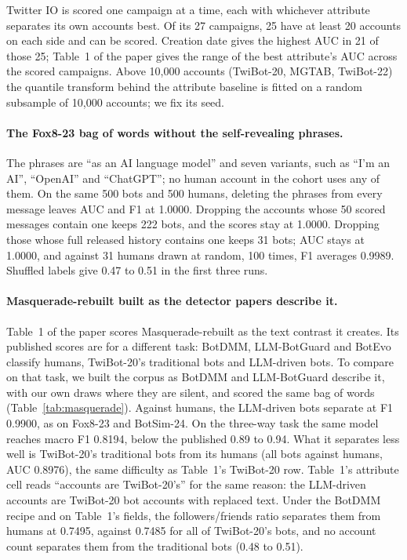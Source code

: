 \documentclass[10pt,a4paper]{article}
\begin{document}
Twitter IO is scored one campaign at a time, each with whichever attribute separates its own
  accounts best.
Of its 27 campaigns, 25 have at least 20 accounts on each side and can be scored.
Creation date gives the highest AUC in 21 of those 25; Table~1 of the paper gives the
  range of the best attribute's AUC across the scored campaigns.
Above 10,000 accounts (TwiBot-20, MGTAB, TwiBot-22) the quantile transform behind the attribute baseline is fitted
  on a random subsample of 10,000 accounts; we fix its seed.

\paragraph{The Fox8-23 bag of words without the self-revealing phrases.}
The phrases are ``as an AI language model'' and seven variants, such as ``I'm an AI'',
  ``OpenAI'' and ``ChatGPT''; no human account in the cohort uses any of them.
On the same 500 bots and 500 humans, deleting the phrases from every message leaves AUC and F1 at
  1.0000.
Dropping the accounts whose 50 scored messages contain one keeps 222 bots, and the scores stay at
  1.0000.
Dropping those whose full released history contains one keeps 31 bots; AUC stays at 1.0000, and
  against 31 humans drawn at random, 100 times, F1 averages 0.9989.
Shuffled labels give 0.47 to 0.51 in the first three runs.

\paragraph{Masquerade-rebuilt built as the detector papers describe it.}
Table~1 of the paper scores Masquerade-rebuilt as the text contrast it creates.
Its published scores are for a different task: BotDMM, LLM-BotGuard and BotEvo classify humans,
  TwiBot-20's traditional bots and LLM-driven bots.
To compare on that task, we built the corpus as BotDMM and LLM-BotGuard describe it, with our own
  draws where they are silent, and scored the same bag of words (Table~\ref{tab:masquerade}).
Against humans, the LLM-driven bots separate at F1 0.9900, as on Fox8-23 and BotSim-24.
On the three-way task the same model reaches macro F1 0.8194, below the published 0.89 to 0.94.
What it separates less well is TwiBot-20's traditional bots from its humans (all bots against
  humans, AUC 0.8976), the same difficulty as Table~1's TwiBot-20 row.
Table~1's attribute cell reads ``accounts are TwiBot-20's'' for the same reason:
  the LLM-driven accounts are TwiBot-20 bot accounts with replaced text.
Under the BotDMM recipe and on Table~1's fields, the followers/friends ratio
  separates them from humans at
  0.7495, against 0.7485 for all of TwiBot-20's bots, and no account count separates them from the
  traditional bots (0.48 to 0.51).
\end{document}
